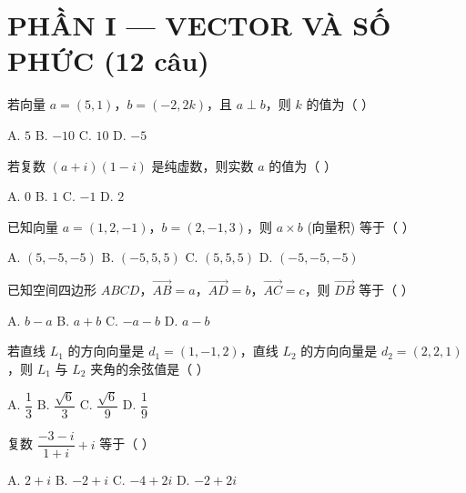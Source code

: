 \documentclass[11pt, a4paper]{article}
\begin{document}

\section{PHẦN I — VECTOR VÀ SỐ PHỨC (12 câu)}

\begin{baitap}[1]
若向量 $a=(5,1)$，$b=(-2,2k)$，且 $a\perp b$，则 $k$ 的值为（ ）
\par\vspace{3pt}
\noindent A. $5$ \quad B. $-10$ \quad C. $10$ \quad D. $-5$
\end{baitap}

\begin{baitap}[2]
若复数 $(a+i)(1-i)$ 是纯虚数，则实数 $a$ 的值为（ ）
\par\vspace{3pt}
\noindent A. $0$ \quad B. $1$ \quad C. $-1$ \quad D. $2$
\end{baitap}

\begin{baitap}[3]
已知向量 $a=(1,2,-1)$，$b=(2,-1,3)$，则 $a\times b$ (向量积) 等于（ ）
\par\vspace{3pt}
\noindent A. $(5,-5,-5)$ \quad B. $(-5,5,5)$ \quad C. $(5,5,5)$ \quad D. $(-5,-5,-5)$
\end{baitap}

\begin{baitap}[4]
已知空间四边形 $ABCD$，$\overrightarrow{AB}=a$，$\overrightarrow{AD}=b$，$\overrightarrow{AC}=c$，则 $\overrightarrow{DB}$ 等于（ ）
\par\vspace{3pt}
\noindent A. $b-a$ \quad B. $a+b$ \quad C. $-a-b$ \quad D. $a-b$
\end{baitap}

\begin{baitap}[5]
若直线 $L_1$ 的方向向量是 $d_1=(1,-1,2)$，直线 $L_2$ 的方向向量是 $d_2=(2,2,1)$，则 $L_1$ 与 $L_2$ 夹角的余弦值是（ ）
\par\vspace{3pt}
\noindent A. $\dfrac{1}{3}$ \quad B. $\dfrac{\sqrt{6}}{3}$ \quad C. $\dfrac{\sqrt{6}}{9}$ \quad D. $\dfrac{1}{9}$
\end{baitap}

\begin{baitap}[6]
复数 $\dfrac{-3-i}{1+i}+i$ 等于（ ）
\par\vspace{3pt}
\noindent A. $2+i$ \quad B. $-2+i$ \quad C. $-4+2i$ \quad D. $-2+2i$
\end{baitap}
\end{document}
